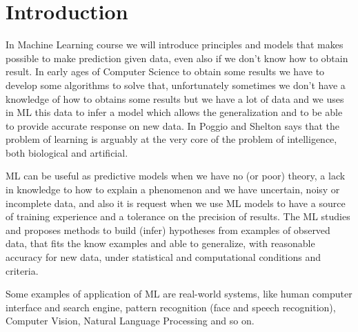 \chapter{Introduction}
In Machine Learning course we will introduce principles and models that makes possible to make prediction
given data, even also if we don't know how to obtain result.\newline
In early ages of Computer Science to obtain some results we have to develop some algorithms to solve that,
unfortunately sometimes we don't have a knowledge of how to obtains some results but we have a lot of data and we 
uses in ML this data to infer a model which allows the generalization and to be able to provide accurate response
on new data.\newline
In \cite{aiMagazine} Poggio and Shelton says that the problem of learning is arguably at the very core of 
the problem of intelligence, both biological and artificial.

ML can be useful as predictive models when we have no (or poor) theory, a lack in knowledge to how to explain
a phenomenon and we have uncertain, noisy or incomplete data, and also it is request when we use ML models 
to have a source of training experience and a tolerance on the precision of results.\newline
The ML studies and proposes methods to build (infer) hypotheses from examples
of observed data, that fits the know examples and able to generalize, with reasonable accuracy for new data,
under statistical and computational conditions and criteria.

Some examples of application of ML are real-world systems, like human computer interface and search engine,
pattern recognition (face and speech recognition), Computer Vision, Natural Language Processing and so on.

